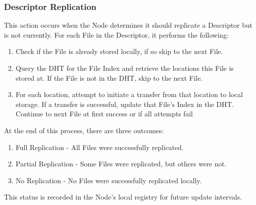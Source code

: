 \documentclass[letterpaper,11pt]{article}
\begin{document}
\subsubsection{Descriptor Replication}

This action occurs when the Node determines it should replicate a Descriptor but is not currently. For each File in the Descriptor, it performs the following:

\begin{enumerate}
\item Check if the File is already stored locally, if so skip to the next File.
\item Query the DHT for the File Index and retrieve the locations this File is stored at. If the File is not in the DHT, skip to the next File.
\item For each location, attempt to initiate a transfer from that location to local storage. If a transfer is successful, update that File's Index in the DHT. Continue to next File at first success or if all attempts fail
\end{enumerate}

At the end of this process, there are three outcomes:
\begin{enumerate}
\item Full Replication - All Files were successfully replicated.
\item Partial Replication - Some Files were replicated, but others were not.
\item No Replication - No Files were successfully replicated locally.
\end{enumerate}

This status is recorded in the Node's local registry for future update intervals.




\end{document}
